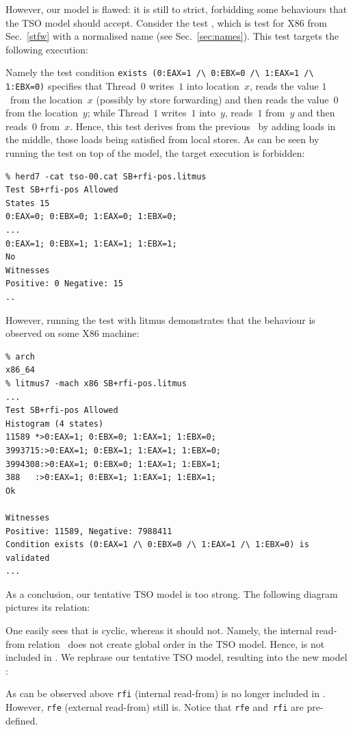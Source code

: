 However,
our model  is flawed: it is still to strict,
forbidding some behaviours that the TSO model should accept.
Consider the test ,
which is test  for X86 from Sec.~\ref{stfw} with a normalised name (see Sec.~\ref{sec:names}).
This test targets the following execution:
\begin{center}\end{center}
Namely the test condition
\verb+exists (0:EAX=1 /\ 0:EBX=0 /\ 1:EAX=1 /\ 1:EBX=0)+
specifies that Thread~$0$ writes~$1$ into location~$x$,
reads the value $1$~from the location~$x$ (possibly by store forwarding) and
then reads the value~$0$ from the location~$y$;
while Thread~$1$ writes~$1$ into~$y$,
reads~$1$ from~$y$ and then reads~$0$ from~$x$.
Hence, this test derives from the previous~
by adding loads in the middle, those loads
being  satisfied from local stores.
As can be seen by running the test on top of the 
model, the target execution is forbidden:
\begin{verbatim}
% herd7 -cat tso-00.cat SB+rfi-pos.litmus
Test SB+rfi-pos Allowed
States 15
0:EAX=0; 0:EBX=0; 1:EAX=0; 1:EBX=0;
...
0:EAX=1; 0:EBX=1; 1:EAX=1; 1:EBX=1;
No
Witnesses
Positive: 0 Negative: 15
..
\end{verbatim}
However, running the test with litmus demonstrates that the behaviour
is observed on some X86 machine:
\begin{verbatim}
% arch
x86_64
% litmus7 -mach x86 SB+rfi-pos.litmus
...
Test SB+rfi-pos Allowed
Histogram (4 states)
11589 *>0:EAX=1; 0:EBX=0; 1:EAX=1; 1:EBX=0;
3993715:>0:EAX=1; 0:EBX=1; 1:EAX=1; 1:EBX=0;
3994308:>0:EAX=1; 0:EBX=0; 1:EAX=1; 1:EBX=1;
388   :>0:EAX=1; 0:EBX=1; 1:EAX=1; 1:EBX=1;
Ok

Witnesses
Positive: 11589, Negative: 7988411
Condition exists (0:EAX=1 /\ 0:EBX=0 /\ 1:EAX=1 /\ 1:EBX=0) is validated
...
\end{verbatim}
As a conclusion, our tentative TSO model is too strong.
The following diagram pictures its  relation:
\begin{center}\end{center}
One easily sees that  is cyclic, whereas it should not.
Namely, the internal read-from relation~ does
not create global order in the TSO model.
Hence,  is not included in .
We rephrase our tentative TSO model, resulting into the new model
:

As can be observed above \texttt{rfi} (internal read-from) is no longer
included in . However, \texttt{rfe} (external read-from)
still is. Notice that \texttt{rfe} and~\texttt{rfi} are pre-defined.


